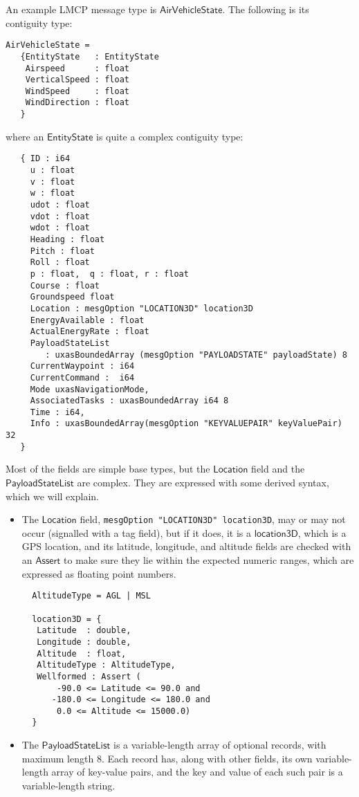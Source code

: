 \documentclass[a4paper,UKenglish,cleveref, autoref, thm-restate]{lipics-v2021}
\newcommand{\konst}[1]{\ensuremath{\mathsf{#1}}}
\begin{document}
An example LMCP message type is \konst{AirVehicleState}. The following
is its contiguity type:

{\small
\begin{verbatim}
AirVehicleState =
   {EntityState   : EntityState
    Airspeed      : float
    VerticalSpeed : float
    WindSpeed     : float
    WindDirection : float
   }
\end{verbatim}
}
\noindent where an \konst{EntityState} is quite a complex contiguity type:
{\small
\begin{verbatim}
   { ID : i64
     u : float
     v : float
     w : float
     udot : float
     vdot : float
     wdot : float
     Heading : float
     Pitch : float
     Roll : float
     p : float,  q : float, r : float
     Course : float
     Groundspeed float
     Location : mesgOption "LOCATION3D" location3D
     EnergyAvailable : float
     ActualEnergyRate : float
     PayloadStateList
        : uxasBoundedArray (mesgOption "PAYLOADSTATE" payloadState) 8
     CurrentWaypoint : i64
     CurrentCommand :  i64
     Mode uxasNavigationMode,
     AssociatedTasks : uxasBoundedArray i64 8
     Time : i64,
     Info : uxasBoundedArray(mesgOption "KEYVALUEPAIR" keyValuePair) 32
   }
\end{verbatim}
}

\noindent Most of the fields are simple base types, but the \konst{Location}
field and the \konst{PayloadStateList} are complex. They are expressed
with some derived syntax, which we will explain.

\begin{itemize}
\item The \konst{Location} field,
  {\small\verb+mesgOption "LOCATION3D" location3D+}, may or may not
  occur (signalled with a tag field), but if it does, it is a
  \konst{location3D}, which is a GPS location, and its latitude,
  longitude, and altitude fields are checked with an \konst{Assert} to
  make sure they lie within the expected numeric ranges, which are
  expressed as floating point numbers.

{\small
\begin{verbatim}
  AltitudeType = AGL | MSL

  location3D = {
   Latitude  : double,
   Longitude : double,
   Altitude  : float,
   AltitudeType : AltitudeType,
   Wellformed : Assert (
       -90.0 <= Latitude <= 90.0 and
      -180.0 <= Longitude <= 180.0 and
       0.0 <= Altitude <= 15000.0)
  }
\end{verbatim}}

\item The \konst{PayloadStateList} is a variable-length array of
  optional records, with maximum length 8. Each record has, along with
  other fields, its own variable-length array of key-value pairs, and
  the key and value of each such pair is a variable-length string.

\end{itemize}
\end{document}
